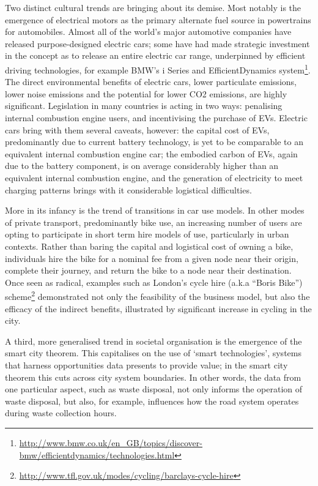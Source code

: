 \documentclass[journal]{IEEEtran}
\begin{document}
Two distinct cultural trends are bringing about its demise. Most
notably is the emergence of electrical motors as the primary alternate
fuel source in powertrains for automobiles. Almost all of the world's
major automotive companies have released purpose-designed electric
cars; some have had made strategic investment in the concept as to
release an entire electric car range, underpinned by efficient driving
technologies, for example BMW's i Series and EfficientDynamics
system\footnote{\url{http://www.bmw.co.uk/en_GB/topics/discover-bmw/efficientdynamics/technologies.html}}.
The direct environmental benefits of electric cars, lower particulate
emissions, lower noise emissions and the potential for lower CO2
emissions, are highly significant. Legislation in many countries is
acting in two ways: penalising internal combustion engine users, and
incentivising the purchase of EVs. Electric cars bring with them
several caveats, however: the capital cost of EVs, predominantly due
to current battery technology, is yet to be comparable to an
equivalent internal combustion engine car; the embodied carbon of EVs,
again due to the battery component, is on average considerably higher
than an equivalent internal combustion engine, and the generation of
electricity to meet charging patterns brings with it considerable
logistical difficulties.

More in its infancy is the trend of transitions in car use models. In
other modes of private transport, predominantly bike use, an
increasing number of users are opting to participate in short term
hire models of use, particularly in urban contexts. Rather than baring
the capital and logistical cost of owning a bike, individuals hire the
bike for a nominal fee from a given node near their origin, complete
their journey, and return the bike to a node near their
destination. Once seen as radical, examples such as London's cycle
hire (a.k.a ``Boris Bike'')
scheme\footnote{\url{http://www.tfl.gov.uk/modes/cycling/barclays-cycle-hire}}
demonstrated not only the feasibility of the business model, but also
the efficacy of the indirect benefits, illustrated by significant
increase in cycling in the city.

A third, more generalised trend in societal organisation is the
emergence of the smart city theorem. This capitalises on the use of
`smart technologies', systems that harness opportunities data presents
to provide value; in the smart city theorem this cuts across city
system boundaries. In other words, the data from one particular
aspect, such as waste disposal, not only informs the operation of
waste disposal, but also, for example, influences how the road system
operates during waste collection hours.
\end{document}
